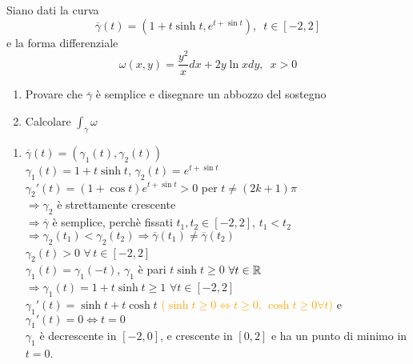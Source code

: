 \begin{exbar}
\begin{example}
	Siano dati la curva 
	\begin{equation*}
		\overline{\gamma}(t)=(1+t \sinh t, e^{t+\sin t}), \,\,\, t \in [-2,2]
	\end{equation*}
	e la forma differenziale
	\begin{equation*}
		\omega(x,y)=\frac{y^2}{x} dx+2y \ln x dy,\,\,\, x >0
	\end{equation*}
	\begin{enumerate}
		\item Provare che $\overline{\gamma}$ è semplice e disegnare un abbozzo del sostegno
		\item Calcolare $\int_{\overline{\gamma}}\omega$
	\end{enumerate}
	\begin{enumerate}
		\item $\overline{\gamma}(t)=(\gamma_1(t),\gamma_2(t))$\\
		$\gamma_1(t)=1+t \sinh t$, $\gamma_2 (t)=e^{t+\sin t}$\\
		$\gamma_2' (t)=(1+\cos t) e^{t+\sin t} >0$ per $ t \neq (2k+1)\pi$\\
		$\Rightarrow \gamma_2$ è strettamente crescente\\
		$\Rightarrow \overline{\gamma}$ è semplice, perchè fissati $t_1, t_2 \in [-2,2]$, $t_1< t_2$\\
		$\Rightarrow \gamma_2(t_1)< \gamma_2(t_2)\Rightarrow \overline{\gamma}(t_1)\neq \overline{\gamma}(t_2)$\\
		$\gamma_2 (t)>0$ $\forall \, t \in [-2,2]$\\
		$\gamma_1 (t)= \gamma_1(-t)$, $\gamma_1$ è pari $t\sinh t \geq 0$ $\forall t \in \mathbb{R}$\\
		$\Rightarrow \gamma_1(t)= 1+t \sinh t \geq 1$ $\forall t \in [-2,2]$\\
		$\gamma_1' (t)=\sinh t + t \cosh t$ \textcolor{orange}{($\sinh t \geq 0 \Leftrightarrow t \geq 0$, $\cosh t \geq 0 \forall t$)} e $\gamma_1' (t)=0 \Leftrightarrow t=0$\\
		$\gamma_1$ è decrescente in $[-2,0]$, e crescente in $[0,2]$ e ha un punto di minimo in $t=0$.\\
		
		\segnaposto %
		

\end{enumerate}
\end{example}
\end{exbar}
